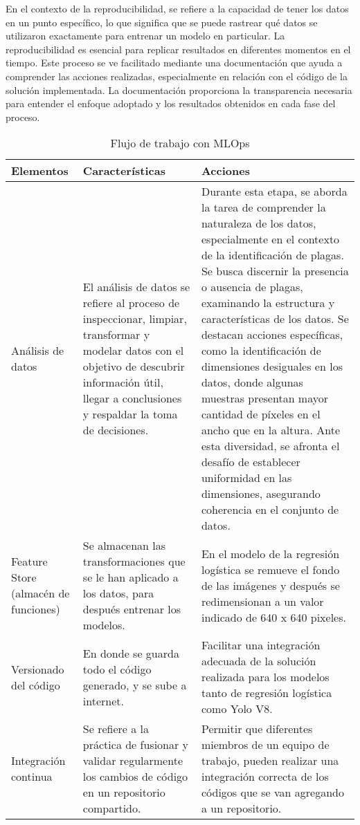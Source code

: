 \newpage

En el contexto de la reproducibilidad, se refiere a la capacidad de tener los datos en un punto específico, lo que significa que se puede rastrear qué datos se utilizaron exactamente para entrenar un modelo en particular. La reproducibilidad es esencial para replicar resultados en diferentes momentos en el tiempo. Este proceso se ve facilitado mediante una documentación que ayuda a comprender las acciones realizadas, especialmente en relación con el código de la solución implementada. La documentación proporciona la transparencia necesaria para entender el enfoque adoptado y los resultados obtenidos en cada fase del proceso.

\begin{longtable}{|p{3cm}|p{5cm}|p{6cm}|}
\caption{Flujo de trabajo con MLOps}\\
    \hline
    \textbf{Elementos} & \textbf{Características} & \textbf{Acciones} \\
    \hline
    \endhead
        Análisis de datos & El análisis de datos se refiere al proceso de inspeccionar, limpiar, transformar y modelar datos con el objetivo de descubrir información útil, llegar a conclusiones y respaldar la toma de decisiones. & Durante esta etapa, se aborda la tarea de comprender la naturaleza de los datos, especialmente en el contexto de la identificación de plagas. Se busca discernir la presencia o ausencia de plagas, examinando la estructura y características de los datos. Se destacan acciones específicas, como la identificación de dimensiones desiguales en los datos, donde algunas muestras presentan mayor cantidad de píxeles en el ancho que en la altura. Ante esta diversidad, se afronta el desafío de establecer uniformidad en las dimensiones, asegurando coherencia en el conjunto de datos. \\
        \hline
        Feature Store (almacén de funciones) & Se almacenan las transformaciones que se le han aplicado a los datos, para después entrenar los modelos. & En el modelo de la regresión logística se remueve el fondo de las imágenes y después se redimensionan a un valor indicado de 640 x 640 pixeles. \\
        \hline
        Versionado del código & En donde se guarda todo el código generado, y se sube a internet. & Facilitar una integración adecuada de la solución realizada para los modelos tanto de regresión logística como Yolo V8. \\
        \hline
        Integración continua & Se refiere a la práctica de fusionar y validar regularmente los cambios de código en un repositorio compartido. & Permitir que diferentes miembros de un equipo de trabajo, pueden realizar una integración correcta de los códigos que se van agregando a un repositorio. \\

\end{longtable}
